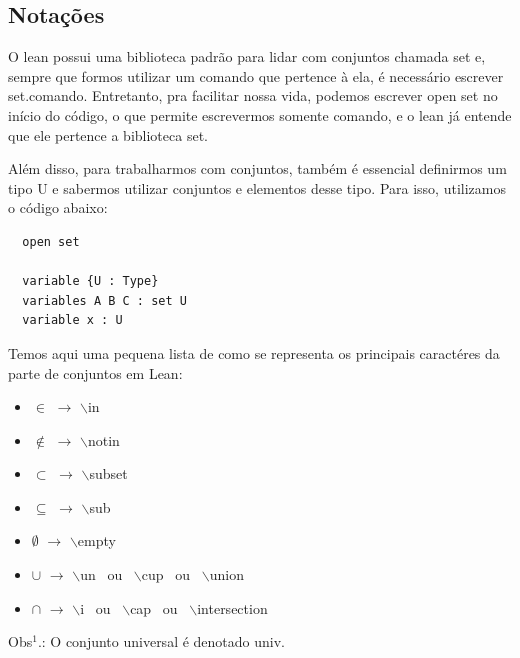   \subsection{Notações}
  O lean possui uma biblioteca padrão para lidar com conjuntos chamada set e, sempre que formos utilizar um comando que pertence à ela, é necessário escrever {\selectfont set.comando}. Entretanto, pra facilitar nossa vida, podemos escrever {\selectfont open set} no início do código, o que permite escrevermos somente {\selectfont comando}, e o lean já entende que ele pertence a biblioteca set.
  
  Além disso, para trabalharmos com conjuntos, também é essencial definirmos um tipo {\selectfont U} e sabermos utilizar conjuntos e elementos desse tipo. Para isso, utilizamos o código abaixo:

  \begin{lstlisting}
  open set

  variable {U : Type}
  variables A B C : set U
  variable x : U \end{lstlisting}

  Temos aqui uma pequena lista de como se representa os principais caractéres da parte de conjuntos em Lean: 

  \begin{itemize}
      \item $\in$ $\rightarrow$ $\backslash$in
    
      \item $\notin$ $\rightarrow$ $\backslash$notin
    
      \item $\subset$ $\rightarrow$ $\backslash$subset
    
      \item $\subseteq$ $\rightarrow$ $\backslash$sub
    
      \item $\emptyset$ $\rightarrow$ $\backslash$empty
    
      \item $\cup$ $\rightarrow$ $\backslash$un \ ou \ $\backslash$cup \ ou \ $\backslash$union
    
      \item $\cap$ $\rightarrow$ $\backslash$i \ ou \ $\backslash$cap \ ou \ $\backslash$intersection
  \end{itemize}

  Obs$^{1}$.: O conjunto universal é denotado { \selectfont univ}.

